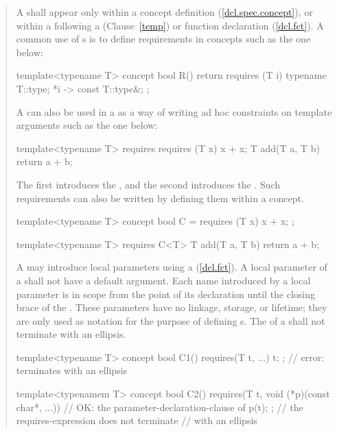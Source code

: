 \begin{quote}
\pnum
A  shall appear
only within a concept definition (\ref{dcl.spec.concept}),
or within a  following a
(Clause~\ref{temp}) or function declaration (\ref{dcl.fct}).
% 
\enterexample
A common use of s is to define
requirements in concepts such as the one below:
\begin{codeblock}
template<typename T>
  concept bool R() {
    return requires (T i) {
      typename T::type;
      {*i} -> const T::type&;
    };
  }
\end{codeblock}
A  can also be used in a 
 as a way of writing ad hoc 
constraints on template arguments such as the one below:
\begin{codeblock}
template<typename T>
  requires requires (T x) { x + x; }
    T add(T a, T b) { return a + b; }
\end{codeblock}
The first  introduces the 
, and the second
introduces the .
\exitexample
\enternote
Such requirements can also be written by defining them within
a concept.
\begin{codeblock}
template<typename T>
  concept bool C = requires (T x) { x + x; };

template<typename T> requires C<T> 
  T add(T a, T b) { return a + b; }
\end{codeblock}
\exitnote

\pnum
A  may introduce local parameters using a
(\ref{dcl.fct}). 
%
A local parameter of a  shall not have a 
default argument.
%
Each name introduced by a local parameter is in scope from the point
of its declaration until the closing brace of the
.
%
These parameters have no linkage, storage, or lifetime; they are only used
as notation for the purpose of defining s.
%
The  of a 
 shall
not terminate with an ellipsis.
\enterexample
\begin{codeblock}
template<typename T>
  concept bool C1() { 
    requires(T t, ...) { t; }; // error: terminates with an ellipsis
  }

template<typenamem T>
  concept bool C2() { 
    requires(T t, void (*p)(const char*, ...)) // OK: the parameter-declaration-clause of
    { p(t); };                                 // the requires-expression does not terminate 
  }                                            // with an ellipsis
\end{codeblock}
\exitexample


\end{quote}
